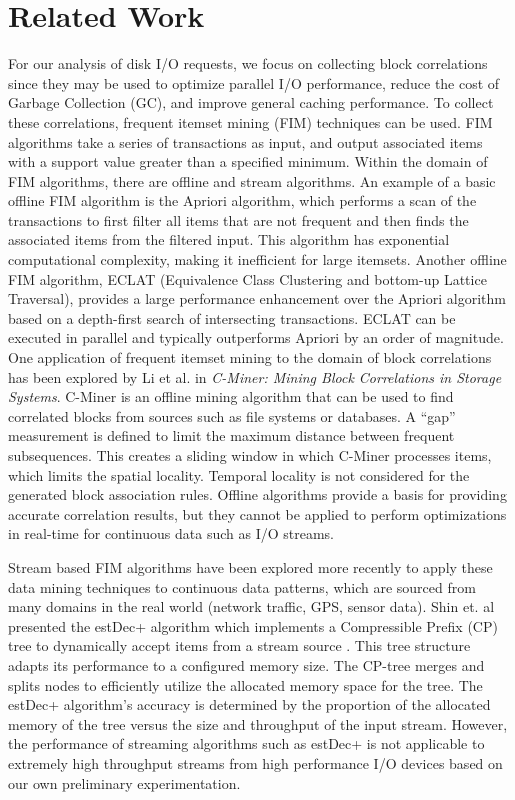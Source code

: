 \documentclass[MEng]{uofl}
\begin{document}
\chapter{Related Work}
For our analysis of disk I/O requests, we focus on collecting block correlations since they may be used to optimize parallel I/O performance, reduce the cost of Garbage Collection (GC), and improve general caching performance. To collect these correlations, frequent itemset mining (FIM) techniques can be used\cite{Li}. FIM algorithms take a series of transactions as input, and output associated items with a support value greater than a specified minimum.  Within the domain of FIM algorithms, there are offline and stream algorithms. An example of a basic offline FIM algorithm is the Apriori algorithm, which performs a scan of the transactions to first filter all items that are not frequent and then finds the associated items from the filtered input\cite{borge}. This algorithm has exponential computational complexity, making it inefficient for large itemsets. Another offline FIM algorithm, ECLAT (Equivalence Class Clustering and bottom-up Lattice Traversal), provides a large performance enhancement over the Apriori algorithm based on a depth-first search of intersecting transactions\cite{borge}. ECLAT can be executed in parallel and typically outperforms Apriori by an order of magnitude\cite{borge}. One application of frequent itemset mining to the domain of block correlations has been explored by Li et al. in \textit{C-Miner: Mining Block Correlations in Storage Systems}\cite{Li}. C-Miner is an offline mining algorithm that can be used to find correlated blocks from sources such as file systems or databases. A “gap” measurement is defined to limit the maximum distance between frequent subsequences\cite{Li}. This creates a sliding window in which C-Miner processes items, which limits the spatial locality. Temporal locality is not considered for the generated block association rules. Offline algorithms provide a basis for providing accurate correlation results, but they cannot be applied to perform optimizations in real-time for continuous data such as I/O streams.

Stream based FIM algorithms have been explored more recently to apply these data mining techniques to continuous data patterns, which are sourced from many domains in the real world (network traffic, GPS, sensor data)\cite{Shin}. Shin et. al presented the estDec+ algorithm which implements a Compressible Prefix (CP) tree to dynamically accept items from a stream source \cite{Shin}. This tree structure adapts its performance to a configured memory size. The CP-tree merges and splits nodes to efficiently utilize the allocated memory space for the tree. The estDec+ algorithm’s accuracy is determined by the proportion of the allocated memory of the tree versus the size and throughput of the input stream.  However, the performance of streaming algorithms such as estDec+ is not applicable to extremely high throughput streams from high performance I/O devices based on our own preliminary experimentation. 
\end{document}

